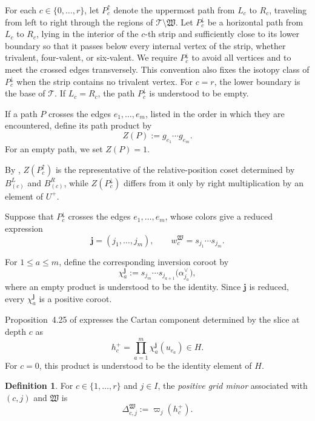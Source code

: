 \documentclass[12pt, reqno]{amsart}
\theoremstyle{plain}
\theoremstyle{definition}
\newtheorem{definition}[theorem]{Definition}
\numberwithin{equation}{section}
\begin{document}
For each \(c\in\{0,\ldots,r\}\), let \(P_c^\uparrow\) denote the
uppermost path from \(L_c\) to \(R_c\), traveling from left to right
through the regions of \(\mathcal T\setminus\mathfrak W\). Let \(P_c^\downarrow\) be a horizontal path from \(L_c\) to \(R_c\),
lying in the interior of the \(c\)-th strip and sufficiently close to
its lower boundary so that it passes below every internal vertex of
the strip, whether trivalent, four-valent, or six-valent. We require
\(P_c^\downarrow\) to avoid all vertices and to meet the crossed edges
transversely. This convention also fixes the isotopy class of
\(P_c^\downarrow\) when the strip contains no trivalent vertex. For
\(c=r\), the lower boundary is the base of \(\mathcal T\). If
\(L_c=R_c\), the path \(P_c^\downarrow\) is understood to be empty.

If a path \(P\) crosses the edges \(e_1,\ldots,e_m\), listed in the
order in which they are encountered, define its path product by
\[
    Z(P):=g_{e_1}\cdots g_{e_m}.
\]
For an empty path, we set \(Z(P)=1\).

By \cite[Lemma~4.24]{casals2025comparing},
\(Z(P_c^\uparrow)\) is the representative of the relative-position
coset determined by \(B_{(c)}^L\) and \(B_{(c)}^R\), while
\(Z(P_c^\downarrow)\) differs from it only by right multiplication by
an element of \(U^+\).

Suppose that \(P_c^\downarrow\) crosses the edges
\(e_1,\ldots,e_m\), whose colors give a reduced expression
\[
    \mathbf j=(j_1,\ldots,j_m),
    \qquad
    w_c^{\mathfrak W}
    =
    s_{j_1}\cdots s_{j_m}.
\]


For \(1\leq a\leq m\), define the corresponding inversion coroot by
\begin{equation}\label{eq:inversion-coroots}
    \chi_a^{\mathbf j}
    :=
    s_{j_m}\cdots s_{j_{a+1}}
    \bigl(\alpha_{j_a}^\vee\bigr),
\end{equation}
where an empty product is understood to be the identity. Since
\(\mathbf j\) is reduced, every
\(\chi_a^{\mathbf j}\) is a positive coroot.

Proposition~4.25 of \cite{casals2025comparing} expresses the Cartan
component determined by the slice at depth \(c\) as
\begin{equation}\label{eq:hc-plus}
    h_c^+
    =
    \prod_{a=1}^m
    \chi_a^{\mathbf j}(u_{e_a})
    \in H.
\end{equation}
For \(c=0\), this product is understood to be the identity element
of \(H\).

\begin{definition}\label{def:grid-minors}
For \(c\in\{1,\ldots,r\}\) and \(j\in I\), the \emph{positive grid
minor} associated with \((c,j)\) and \(\mathfrak W\) is
\begin{equation}\label{eq:def-grid-minor}
    \Delta_{c,j}^{\mathfrak W}
    :=
    \varpi_j(h_c^+).
\end{equation}
\end{definition}
\end{document}
